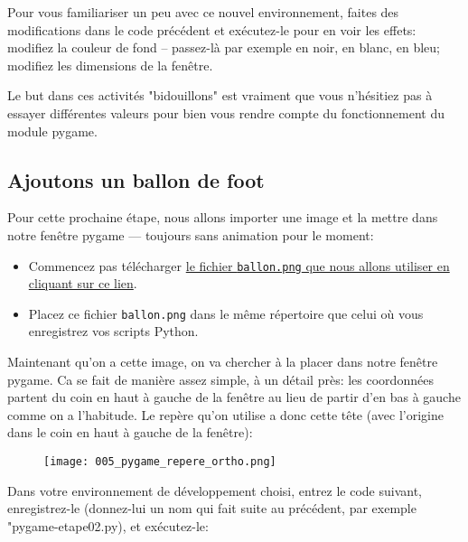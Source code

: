 \documentclass[11pt]{article}
\begin{document}
	\begin{MonAct}
		Pour vous familiariser un peu avec ce nouvel environnement, faites des modifications dans le code précédent et exécutez-le pour en voir les effets: modifiez la couleur de fond -- passez-là par exemple en noir, en blanc, en bleu; modifiez les dimensions de la fenêtre.
		
		Le but dans ces activités "bidouillons" est vraiment que vous n'hésitiez pas à essayer différentes valeurs pour bien vous rendre compte du fonctionnement du module pygame.
	\end{MonAct}
	
	\subsection*{Ajoutons un ballon de foot}
	Pour cette prochaine étape, nous allons importer une image et la mettre dans notre fenêtre pygame --- toujours sans animation pour le moment:
	\begin{itemize}
		\item Commencez pas télécharger \href{https://github.com/marc-biver/Vrac/blob/main/ballon.png}{le fichier \texttt{ballon.png} que nous allons utiliser en cliquant sur ce lien}.
		\item Placez ce fichier \texttt{ballon.png} dans le même répertoire que celui où vous enregistrez vos scripts Python.
	\end{itemize}
	
	Maintenant qu'on a cette image, on va chercher à la placer dans notre fenêtre pygame. Ca se fait de manière assez simple, à un détail près: les coordonnées partent du coin en haut à gauche de la fenêtre au lieu de partir d'en bas à gauche comme on a l'habitude. Le repère qu'on utilise a donc cette tête (avec l'origine dans le coin en haut à gauche de la fenêtre):
	
	\begin{figure}[H]
		\centering
		\texttt{[image: 005\_pygame\_repere\_ortho.png]}
	\end{figure}
	
	Dans votre environnement de développement choisi, entrez le code suivant, enregistrez-le (donnez-lui un nom qui fait suite au précédent, par exemple "pygame-etape02.py), et exécutez-le:
	\vspace{0.1cm}
	
\end{document}
